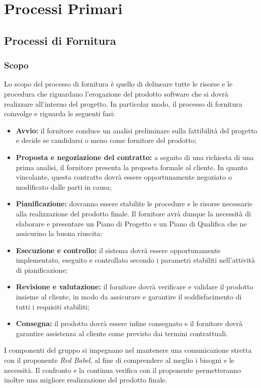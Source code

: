 \section{Processi Primari}
\subsection{Processi di Fornitura}
\subsubsection{Scopo}
Lo scopo del processo di fornitura è quello di delineare tutte le risorse e le procedura che riguardano l'erogazione del prodotto software che si dovrà realizzare all'interno del progetto. In particolar modo, il processo di fornitura coinvolge e riguarda le seguenti fasi:
\begin{itemize}
	\item \textbf{Avvio:} il fornitore conduce un analisi preliminare sulla fattibilità del progetto e decide se candidarsi o meno come fornitore del prodotto;
	\item \textbf{Proposta e negoziazione del contratto:} a seguito di una richiesta di una prima analisi, il fornitore presenta la proposta formale al cliente. In quanto vincolante, questa contratto dovrà essere opportunamente negoziato o modificato dalle parti in causa;
	\item \textbf{Pianificazione:} dovranno essere stabilite le procedure e le risorse necessarie alla realizzazione del prodotto finale. Il fornitore avrà dunque la necessità di elaborare e presentare un Piano di Progetto e un Piano di Qualifica che ne assicurino la buona riuscita;
	\item \textbf{Esecuzione e controllo:} il sistema dovrà essere opportunamente implementato, eseguito e controllato secondo i parametri stabiliti nell'attività di pianificazione;
	\item \textbf{Revisione e valutazione:} il fornitore dovrà verificare e validare il prodotto insieme al cliente, in modo da assicurare e garantire il soddisfacimento di tutti i requisiti stabiliti;
	\item \textbf{ Consegna:} il prodotto dovrà essere infine consegnato e il fornitore dovrà garantire assistenza al cliente come previsto dai termini contrattuali.
\end{itemize} 
I componenti del gruppo si impegnano nel mantenere una comunicazione stretta con il proponente \textit{Red Babel}, al fine di comprendere al meglio i bisogni e le necessità. Il confronto e la continua verifica con il proponente permetteranno inoltre una migliore realizzazione del prodotto finale.
